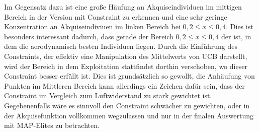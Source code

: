 Im Gegensatz dazu ist eine große Häufung an Akquiseindividuen im mittigen Bereich in der Version mit Constraint zu erkennen
und eine sehr geringe Konzentration an Akquiseindiviuen im linken Bereich bei $0,2 \leq x \leq 0,4$.
Dies ist besonders interessant dadurch, dass gerade der Bereich $0,2 \leq x \leq 0,4$ der ist, in dem die aerodynamisch besten Individuen liegen.
Durch die Einführung des Constraints, der effektiv eine Manipulation des Mittelwerts von UCB darstellt, wird der Bereich in dem Exploitation stattfindet dorthin verschoben, wo dieser Constraint besser erfüllt ist.
Dies ist grundsätzlich so gewollt, die Anhäufung von Punkten im Mittleren Bereich kann allerdings ein Zeichen dafür sein, dass der Constraint im Vergleich zum Luftwiderstand zu stark gewichtet ist.
Gegebenenfalls wäre es sinnvoll den Constraint schwächer zu gewichten, oder in der Akquisefunktion vollkommen wegzulassen und nur in der finalen Auswertung mit MAP-Elites zu betrachten.

\newcommand{\wheelcasepheno}[1]{
	\begin{figure}[h]
		\centering
		\begin{subfigure}[t]{0.5\textwidth}
			\centering
			\texttt{[image: bilder/6pt1000Samples/\#1-uncon-top.png]}
			\subcaption{oben, ohne Constraint}
		\end{subfigure}\hfill
		\begin{subfigure}[t]{0.5\textwidth}
			\centering
			\texttt{[image: bilder/6pt1000Samples/\#1-uncon-angled.png]}
			\subcaption{perspektivisch, ohne Constraint}
		\end{subfigure}
		\begin{subfigure}[b]{0.5\textwidth}
			\centering
			\texttt{[image: bilder/6pt1000Samples/\#1-con-top.png]}
			\subcaption{oben, mit Constraint}
		\end{subfigure}\hfill
		\begin{subfigure}[b]{0.5\textwidth}
			\centering
			\texttt{[image: bilder/6pt1000Samples/\#1-con-angled.png]}
			\subcaption{perspektivisch, mit Constraint}
		\end{subfigure}
		\caption{Die Phänotypen des Individuums (#1) mit und ohne Constraint}
		\label{wheelcasepheno#1}
	\end{figure}
}

\newcommand{\wref}[1]{
	\cref{fig:wheelcasepheno#1}
}

